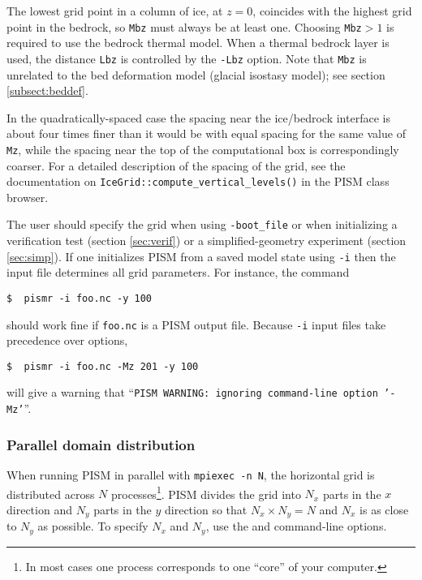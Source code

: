 The lowest grid point in a column of ice, at $z=0$, coincides with the highest grid point in the bedrock, so \texttt{Mbz} must always be at least one.  Choosing \texttt{Mbz}$>1$ is required to use the bedrock thermal model.  When a thermal bedrock layer is used, the distance \texttt{Lbz} is controlled by the \texttt{-Lbz} option.  Note that \texttt{Mbz} is unrelated to the bed deformation model (glacial isostasy model); see section \ref{subsect:beddef}.

In the quadratically-spaced case the spacing near the ice/bedrock interface is about four times finer than it would be with equal spacing for the same value of \texttt{Mz}, while the spacing near the top of the computational box is correspondingly coarser.  For a detailed description of the spacing of the grid, see the documentation on \texttt{IceGrid::compute_vertical_levels()} in the PISM class browser.

The user should specify the grid when using \texttt{-boot_file} or when initializing a verification test (section \ref{sec:verif}) or a simplified-geometry experiment (section \ref{sec:simp}).  If one initializes PISM from a saved model state using \texttt{-i} then the input file determines all grid parameters.  For instance, the command

\begin{verbatim}
$  pismr -i foo.nc -y 100
\end{verbatim}

\noindent should work fine if \texttt{foo.nc} is a PISM output file.  Because \texttt{-i} input files take precedence over options,

\begin{verbatim}
$  pismr -i foo.nc -Mz 201 -y 100
\end{verbatim}

\noindent will give a warning that ``\texttt{PISM WARNING: ignoring command-line option '-Mz'}''.

\subsubsection{Parallel domain distribution}
\label{sec:domain-dstribution}

When running PISM in parallel with \texttt{mpiexec -n N}, the horizontal grid is distributed across $N$ processes\footnote{In most cases one process corresponds to one ``core'' of your computer.}. PISM divides the grid into $N_x$ parts in the $x$ direction and $N_y$ parts in the $y$ direction so that $N_x\times N_y = N$ and $N_x$ is as close to $N_y$ as possible. To specify $N_x$ and $N_y$, use the  and  command-line options.

